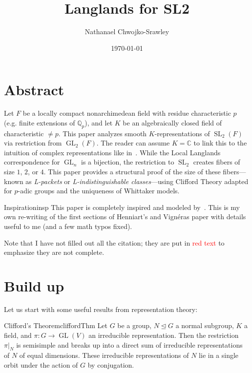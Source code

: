 \documentclass{article}
\title{Langlands for SL2}
\author{Nathanael Chwojko-Srawley}
\date{\today}
\renewcommand{\maketitle}{
    \quad
    \vspace{1em}
  \begin{center}
      \LARGE\bfseries \thetitle \par
      \vspace{0.6em}
      \large
  \end{center}
    \vspace{1em}
}
\newcommand{\GL}{{\operatorname{GL}}}
\newcommand{\SL}{{\operatorname{SL}}}
\begin{document}
\maketitle

\section{Abstract}

Let $F$ be a locally compact nonarchimedean field with residue characteristic $p$ (e.g. finite extensions of
$\mathbb{Q}_p$), and let $K$ be an algebraically closed field of characteristic $\ne p$. This paper analyzes
smooth $K$-representations of $\SL_2(F)$ via restriction from $\GL_2(F)$. The reader can assume $K
= \mathbb{C}$ to link this to the intuition of complex representations like
in~\cite{bushnellLocalLanglandsConjecture2006}. While the Local Langlands correspondence for $\GL_n$ is
a bijection, the restriction to $\SL_2$ creates fibers of size $1$, $2$, or $4$. This paper provides a structural proof of the size of these fibers—known as \emph{L-packets} or \emph{L-indistinguishable classes}—using Clifford Theory adapted for $p$-adic groups and the uniqueness of Whittaker models.

\begin{titledBox}{Inspiration}{insp}
  This paper is completely inspired and modeled by~\cite{henniartRepresentationsSL2F2025}.
  This is my own re-writing of the first sections of Henniart's and Vign\'eras paper with details useful to
  me (and a few math typos fixed).
\end{titledBox}

Note that I have not filled out all the citation; they are put in \textcolor{red}{red text} to emphasize
they are not complete.

\section{Build up}

Let us start with some useful results from representation theory:

\begin{thm}{Clifford's Theorem}{cliffordThm}
	Let $G$ be a group, $N \trianglelefteq G$ a normal subgroup, $K$ a field, and $\pi: G \to \GL(V)$ an irreducible
	representation. Then the restriction $\pi|_N$ is semisimple and breaks up into a direct sum of irreducible representations
	of $N$ of equal dimensions. These irreducible representations of $N$ lie in a single orbit under the action of $G$ by conjugation.
\end{thm}
\end{document}
